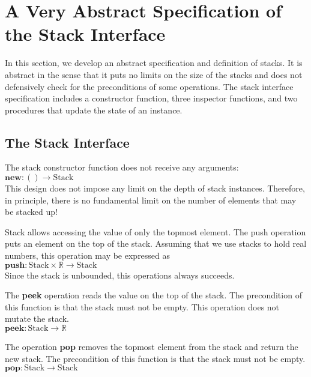 \documentclass[10pt]{article}
\begin{document}
\section{A Very Abstract Specification of the Stack Interface}
\noindent In this section, we develop an abstract specification and definition of stacks. It is abstract in the sense that it puts no limits on the size of the stacks and does not defensively check for the preconditions of some operations. The stack interface specification includes a constructor function, three inspector functions, and two procedures that update the state of an instance. 

\subsection{The Stack Interface}
\noindent The stack constructor function does not receive any arguments:
\vspace*{6pt}\\\hspace*{32pt}\(
\textbf{new}: \mathbf{()} \rightarrow \mathrm{Stack}
\)\vspace*{6pt}\\
This design does not impose any limit on the depth of stack instances. Therefore, in principle, there is no fundamental limit on the number of elements that may be stacked up!

Stack allows accessing the value of only the topmost element. The push operation puts an element on the top of the stack. Assuming that we use stacks to hold real numbers, this operation may be expressed as
\vspace*{6pt}\\\hspace*{32pt}\(
\textbf{push}: \mathrm{Stack} \times \mathbb{R} \rightarrow \mathrm{Stack}
\)\vspace*{6pt}\\
Since the stack is unbounded, this operations always succeeds.

The \textbf{peek} operation reads the value on the top of the stack. The precondition of this function is that the stack must not be empty. This operation does not mutate the stack.
\vspace*{6pt}\\\hspace*{32pt}\(
\textbf{peek}: \mathrm{Stack} \rightarrow {\mathbb{R}}
\)\vspace*{6pt}

The operation {\textbf{pop}} removes the topmost element from the stack and return the new stack. The precondition of this function is that the stack must not be empty.
\vspace*{6pt}\\\hspace*{32pt}\(
\textbf{pop}: \mathrm{Stack} \rightarrow \mathrm{Stack}
\)\vspace*{6pt}
\end{document}
